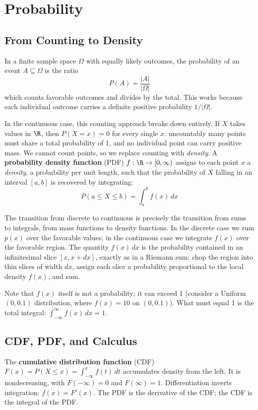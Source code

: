 \documentclass[main.tex]{subfiles}
\begin{document}
\needspace{0.33\textheight}
\section{Probability}

\subsection{From Counting to Density}

In a finite sample space $\Omega$ with equally likely outcomes, the probability of an event $A \subseteq \Omega$ is the ratio
$$P(A) = \frac{|A|}{|\Omega|}$$
which counts favorable outcomes and divides by the total. This works because each individual outcome carries a definite positive probability $1/|\Omega|$.

In the continuous case, this counting approach breaks down entirely. If $X$ takes values in $\R$, then $P(X = x) = 0$ for every single $x$: uncountably many points must share a total probability of 1, and no individual point can carry positive mass. We cannot count points, so we replace counting with \textit{density}. A \textbf{probability density function} (PDF) $f : \R \to [0, \infty)$ assigns to each point $x$ a \textit{density}, a probability per unit length, such that the probability of $X$ falling in an interval $[a, b]$ is recovered by integrating:
$$P(a \leq X \leq b) = \int_a^b f(x)\,dx$$

The transition from discrete to continuous is precisely the transition from sums to integrals, from mass functions to density functions. In the discrete case we sum $p(x)$ over the favorable values; in the continuous case we integrate $f(x)$ over the favorable region. The quantity $f(x)\,dx$ is the probability contained in an infinitesimal slice $[x, x + dx]$, exactly as in a Riemann sum: chop the region into thin slices of width $dx$, assign each slice a probability proportional to the local density $f(x)$, and sum.

Note that $f(x)$ itself is not a probability; it can exceed 1 (consider a Uniform$(0, 0.1)$ distribution, where $f(x) = 10$ on $(0, 0.1)$). What must equal 1 is the total integral: $\int_{-\infty}^{\infty} f(x)\,dx = 1$.

\subsection{CDF, PDF, and Calculus}

The \textbf{cumulative distribution function} (CDF) $F(x) = P(X \leq x) = \int_{-\infty}^{x} f(t)\,dt$ accumulates density from the left. It is nondecreasing, with $F(-\infty) = 0$ and $F(\infty) = 1$. Differentiation inverts integration: $f(x) = F'(x)$. The PDF is the derivative of the CDF; the CDF is the integral of the PDF.
\end{document}
